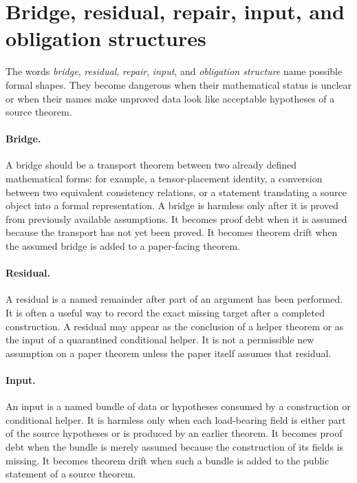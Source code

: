 \documentclass[11pt]{article}
\begin{document}
\section{Bridge, residual, repair, input, and obligation structures}

The words \emph{bridge}, \emph{residual}, \emph{repair}, \emph{input}, and
\emph{obligation structure} name possible formal shapes.  They become dangerous
when their mathematical status is unclear or when their names make unproved
data look like acceptable hypotheses of a source theorem.

\paragraph{Bridge.}
A bridge should be a transport theorem between two already defined
mathematical forms: for example, a tensor-placement identity, a conversion
between two equivalent consistency relations, or a statement translating a
source object into a formal representation.  A bridge is harmless only after it
is proved from previously available assumptions.  It becomes proof debt when it
is assumed because the transport has not yet been proved.  It becomes theorem
drift when the assumed bridge is added to a paper-facing theorem.

\paragraph{Residual.}
A residual is a named remainder after part of an argument has been performed.
It is often a useful way to record the exact missing target after a completed
construction.  A residual may appear as the conclusion of a helper theorem or
as the input of a quarantined conditional helper.  It is not a permissible new
assumption on a paper theorem unless the paper itself assumes that residual.

\paragraph{Input.}
An input is a named bundle of data or hypotheses consumed by a construction or
conditional helper.  It is harmless only when each load-bearing field is either
part of the source hypotheses or is produced by an earlier theorem.  It becomes
proof debt when the bundle is merely assumed because the construction of its
fields is missing.  It becomes theorem drift when such a bundle is added to the
public statement of a source theorem.
\end{document}
